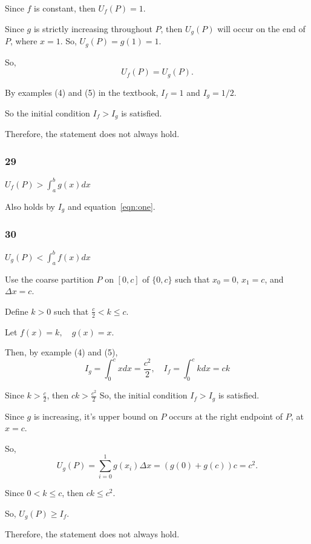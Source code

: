 \documentclass[../hw5.tex]{subfiles}
\begin{document}
Since $f$ is constant, then $U_f(P)=1$.

Since $g$ is strictly increasing throughout $P$, then $U_g(P)$ will occur on the end of $P$, where $x=1$. So, $U_g(P)=g(1)=1$.

So, \[U_f(P)=U_g(P).\]

By examples (4) and (5) in the textbook, $I_f = 1$ and $I_g = 1/2$.

So the initial condition $I_f > I_g$ is satisfied.

Therefore, the statement does not always hold.

\subsubsection*{29}
$U_f(P) > \int_{a}^{b} g(x)dx$

Also holds by $I_g$ and equation~\ref{eqn:one}.

\subsubsection*{30}
$U_g(P) < \int_{a}^{b} f(x)dx$

Use the coarse partition $P$ on $[0,c]$ of $\{0,c\}$ such that $x_0 = 0$, $x_1 = c$, and $\Delta x=c$.

Define $k>0$ such that $\frac{c}{2} < k \leq c$.

Let $f(x)=k, \quad g(x)=x$.

Then, by example (4) and (5),
\[I_g=\int_{0}^{c} x dx = \frac{c^2}{2}, \quad I_f=\int_{0}^{c} kdx = ck\]

Since $k>\frac{c}{2}$, then $ck>\frac{c^2}{2}$
So, the initial condition $I_f>I_g$ is satisfied.

Since $g$ is increasing, it's upper bound on $P$ occurs at the right endpoint of $P$, at $x=c$. 

So, \[U_g(P)=\sum_{i=0}^{1} g(x_i) \Delta x = \left( g(0)+g(c) \right)c = c^2.\]

Since $0<k\leq c$, then $ck \leq c^2$.

So, $U_g(P) \geq I_f$.

Therefore, the statement does not always hold.
\end{document}
